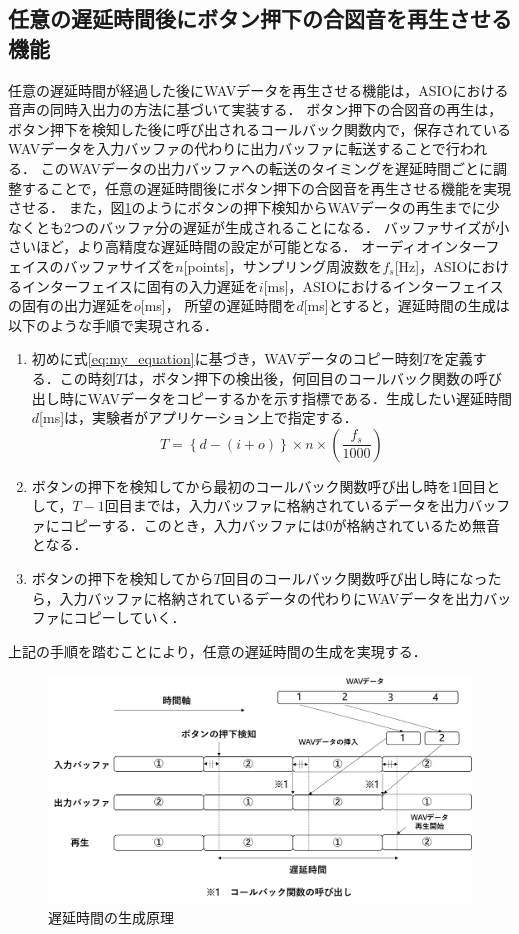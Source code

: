 \subsection{任意の遅延時間後にボタン押下の合図音を再生させる機能}
任意の遅延時間が経過した後にWAVデータを再生させる機能は，ASIOにおける音声の同時入出力の方法に基づいて実装する．
ボタン押下の合図音の再生は，ボタン押下を検知した後に呼び出されるコールバック関数内で，保存されているWAVデータを入力バッファの代わりに出力バッファに転送することで行われる．
このWAVデータの出力バッファへの転送のタイミングを遅延時間ごとに調整することで，任意の遅延時間後にボタン押下の合図音を再生させる機能を実現させる．
また，図\ref{fig:delay_theory}のようにボタンの押下検知からWAVデータの再生までに少なくとも2つのバッファ分の遅延が生成されることになる．
バッファサイズが小さいほど，より高精度な遅延時間の設定が可能となる．
オーディオインターフェイスのバッファサイズを$n$[points]，サンプリング周波数を$f_{s}$[Hz]，ASIOにおけるインターフェイスに固有の入力遅延を$i$[ms]，ASIOにおけるインターフェイスの固有の出力遅延を$o$[ms]，
所望の遅延時間を$d$[ms]とすると，遅延時間の生成は以下のような手順で実現される．
\begin{enumerate}[leftmargin=*]
  \item 初めに式\ref{eq:my_equation}に基づき，WAVデータのコピー時刻$T$を定義する．この時刻$T$は，ボタン押下の検出後，何回目のコールバック関数の呼び出し時にWAVデータをコピーするかを示す指標である．生成したい遅延時間$d$[ms]は，実験者がアプリケーション上で指定する．
\begin{equation}
T = \left\{ d - (i + o) \right\} \times n \times \left( \frac{f_s}{1000} \right) \label{eq:my_equation}
\end{equation}

  \item ボタンの押下を検知してから最初のコールバック関数呼び出し時を1回目として，$T-1$回目までは，入力バッファに格納されているデータを出力バッファにコピーする．このとき，入力バッファには0が格納されているため無音となる．
  \item ボタンの押下を検知してから$T$回目のコールバック関数呼び出し時になったら，入力バッファに格納されているデータの代わりにWAVデータを出力バッファにコピーしていく．
\end{enumerate}
上記の手順を踏むことにより，任意の遅延時間の生成を実現する．
\begin{figure}[h]
  \centering
  \includegraphics[scale=0.12]{figures/System/Delay_theory.pdf}
  \caption{遅延時間の生成原理}
  \label{fig:delay_theory}
\end{figure}
